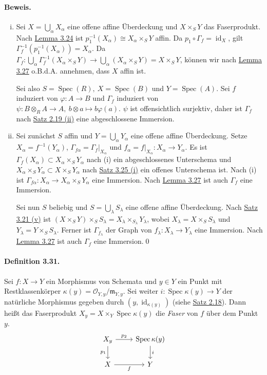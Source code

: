 \paragraph{Beweis.} \begin{enumerate}[(i)]
\item Sei $X=\bigcup_\alpha X_\alpha$ eine offene affine Überdeckung und $X\times_SY$ das Faserprodukt. Nach \hyperref[3.24]{Lemma 3.24} ist $p_1^{-1}(X_\alpha)\cong X_\alpha\times_SY$ affin. Da $p_1\circ\Gamma_f=\operatorname{id}_X$, gilt $\Gamma_f^{-1}(p_1^{-1}(X_\alpha))=X_\alpha$. Da $\Gamma_f: \bigcup_\alpha\Gamma_f^{-1}(X_\alpha\times_SY) \to \bigcup_\alpha(X_\alpha\times_SY)=X\times_SY$, können wir nach \hyperref[3.27]{Lemma 3.27} o.B.d.A. annehmen, dass $X$ affin ist.

Sei also $S=\operatorname{Spec}(R),\ X=\operatorname{Spec}(B)$ und $Y=\operatorname{Spec}(A)$. Sei $f$ induziert von $\varphi:A\to B$ und $\Gamma_f$ induziert von $\psi:B\otimes_RA\to A,\ b\otimes a\mapsto b\varphi(a)$. $\psi$ ist offensichtlich surjektiv, daher ist $\Gamma_f$ nach \hyperref[2.19]{Satz 2.19 (ii)} eine abgeschlossene Immersion.
\item Sei zunächst $S$ affin und $Y=\bigcup_\alpha Y_\alpha$ eine offene affine Überdeckung. Setze $X_\alpha=f^{-1}(Y_\alpha)$, $\Gamma_{f\alpha}=\Gamma_f|_{X_\alpha}$ und $f_\alpha=f|_{X_\alpha}:X_\alpha\to Y_\alpha$. Es ist $\Gamma_f(X_\alpha)\subset X_\alpha\times_SY_\alpha$ nach (i) ein abgeschlossenes Unterschema und $X_\alpha\times_SY_\alpha\subset X\times_SY_\alpha$ nach \hyperref[3.25]{Satz 3.25 (i)} ein offenes Unterschema ist. Nach (i) ist $\Gamma_{f\alpha}:X_\alpha\to X_\alpha\times_SY_\alpha$ eine Immersion. Nach \hyperref[3.27]{Lemma 3.27} ist auch $\Gamma_f$ eine Immersion.

Sei nun $S$ beliebig und $S=\bigcup_\lambda S_\lambda$ eine offene affine Überdeckung. Nach \hyperref[3.21]{Satz 3.21 (v)} ist $(X\times_SY)\times_SS_\lambda=X_\lambda\times_{S_\lambda}Y_\lambda$, wobei $X_\lambda=X\times_SS_\lambda$ und $Y_\lambda=Y\times_SS_\lambda$. Ferner ist $\Gamma_{f_\lambda}$ der Graph von $f_\lambda:X_\lambda\to Y_\lambda$ eine Immersion. Nach \hyperref[3.27]{Lemma 3.27} ist auch $\Gamma_f$ eine Immersion.\qed
\end{enumerate}

\paragraph{Definition 3.31.}\label{3.31} Sei $f:X\to Y$ ein Morphismus von Schemata und $y\in Y$ ein Punkt mit Restklassenkörper $\kappa(y)=\mathcal{O}_{Y,y}/\mathfrak{m}_{Y,y}$. Sei weiter $i:\operatorname{Spec}\kappa(y)\to Y$ der natürliche Morphismus gegeben durch $(y,\operatorname{id}_{\kappa(y)})$ (siehe \hyperref[2.18]{Satz 2.18}). Dann heißt das Faserprodukt $X_y=X\times_Y\operatorname{Spec}\kappa(y)$ die \textit{Faser} von $f$ über dem Punkt $y$.
\[\begin{tikzcd}
X_y\ar[r, "p_2"]\ar[d, "p_1"'] & \operatorname{Spec}\kappa(y)\ar[d, "i"]\\
X\ar[r, "f"'] & Y
\end{tikzcd}\]

